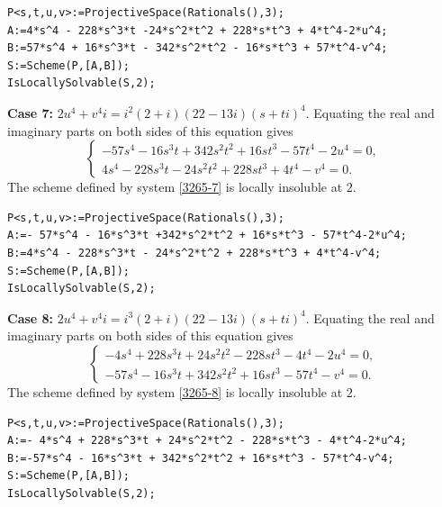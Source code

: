 \documentclass[a4paper,12pt,english,reqno]{amsart}
\begin{document}
\begin{lstlisting}
P<s,t,u,v>:=ProjectiveSpace(Rationals(),3);
A:=4*s^4 - 228*s^3*t -24*s^2*t^2 + 228*s*t^3 + 4*t^4-2*u^4;
B:=57*s^4 + 16*s^3*t - 342*s^2*t^2 - 16*s*t^3 + 57*t^4-v^4;
S:=Scheme(P,[A,B]);
IsLocallySolvable(S,2);
\end{lstlisting}

{\bf Case 7:} $2u^4+v^4i=i^2(2+i)(22-13i)(s+ti)^4$. Equating the real and imaginary parts on both sides of this equation gives
\begin{equation}\label{3265-7}
\begin{cases}
-57s^4 - 16s^3t + 342s^2t^2 + 16st^3 - 57t^4 - 2u^4=0,\\
4s^4 - 228s^3t - 24s^2t^2 + 228st^3 + 4t^4 - v^4=0.
\end{cases}
\end{equation}
The scheme defined by system \eqref{3265-7} is locally insoluble at $2$.



\begin{lstlisting}
P<s,t,u,v>:=ProjectiveSpace(Rationals(),3);
A:=- 57*s^4 - 16*s^3*t +342*s^2*t^2 + 16*s*t^3 - 57*t^4-2*u^4;
B:=4*s^4 - 228*s^3*t - 24*s^2*t^2 + 228*s*t^3 + 4*t^4-v^4;
S:=Scheme(P,[A,B]);
IsLocallySolvable(S,2);
\end{lstlisting}


{\bf Case 8:} $2u^4+v^4i=i^3(2+i)(22-13i)(s+ti)^4$. Equating the real and imaginary parts on both sides of this equation gives
\begin{equation}\label{3265-8}
\begin{cases}
-4s^4 + 228s^3t + 24s^2t^2 - 228st^3 - 4t^4 - 2u^4=0,\\
-57s^4 - 16s^3t + 342s^2t^2 + 16st^3 - 57t^4 - v^4=0.
\end{cases}
\end{equation}
The scheme defined by system \eqref{3265-8} is locally insoluble at $2$.
\begin{lstlisting}
P<s,t,u,v>:=ProjectiveSpace(Rationals(),3);
A:=- 4*s^4 + 228*s^3*t + 24*s^2*t^2 - 228*s*t^3 - 4*t^4-2*u^4;
B:=-57*s^4 - 16*s^3*t + 342*s^2*t^2 + 16*s*t^3 - 57*t^4-v^4;
S:=Scheme(P,[A,B]);
IsLocallySolvable(S,2);
\end{lstlisting}
\end{document}

